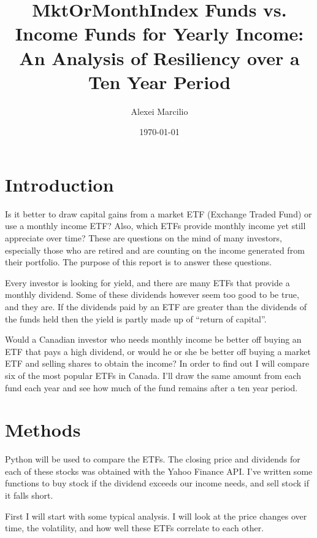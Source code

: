 \documentclass[11pt]{article}
\title{MktOrMonth}
\begin{document}
    

    
    

    \setcounter{secnumdepth}{0}
\title{Index Funds vs. Income Funds for Yearly Income: An Analysis of Resiliency over a Ten Year Period }
\author{Alexei Marcilio}
\date{\today}
\maketitle
\thispagestyle{empty}
\newpage
\setcounter{page}{1} 
\tableofcontents
\newpage
{}
    \hypertarget{introduction}{%
\section{Introduction}\label{introduction}}

    Is it better to draw capital gains from a market ETF (Exchange Traded
Fund) or use a monthly income ETF? Also, which ETFs provide monthly
income yet still appreciate over time? These are questions on the mind
of many investors, especially those who are retired and are counting on
the income generated from their portfolio. The purpose of this report is
to answer these questions.

Every investor is looking for yield, and there are many ETFs that
provide a monthly dividend. Some of these dividends however seem too
good to be true, and they are. If the dividends paid by an ETF are
greater than the dividends of the funds held then the yield is partly
made up of ``return of capital''.

Would a Canadian investor who needs monthly income be better off buying
an ETF that pays a high dividend, or would he or she be better off
buying a market ETF and selling shares to obtain the income? In order to
find out I will compare six of the most popular ETFs in Canada. I'll
draw the same amount from each fund each year and see how much of the
fund remains after a ten year period.

    \hypertarget{methods}{%
\section{Methods}\label{methods}}

    Python will be used to compare the ETFs. The closing price and dividends
for each of these stocks was obtained with the Yahoo Finance API. I've
written some functions to buy stock if the dividend exceeds our income
needs, and sell stock if it falls short.

First I will start with some typical analysis. I will look at the price
changes over time, the volatility, and how well these ETFs correlate to
each other.
\end{document}

